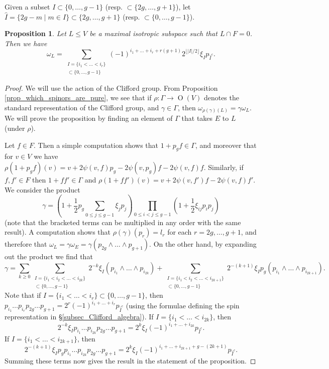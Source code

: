 \documentclass{article} %
\newtheorem{proposition}{Proposition}[section]
\numberwithin{equation}{section}
\DeclareMathOperator{\OO}{O}
\begin{document}
Given a subset $I \subset \{ 0, \dots, g-1 \}$ (resp. $\subset \{ 2g, \dots, g+1 \}$), let $\widehat{I} = \{ 2g-m \mid m \in I \} \subset \{ 2g, \dots, g+1 \}$ (resp. $\subset \{ 0, \dots, g-1 \}$).   
\begin{proposition}\label{prop_computation_of_pure_spinor}
    Let $L \leq V$ be a maximal isotropic subspace such that $L \cap F = 0$. Then we have 
    \[ \omega_L = \sum_{\substack{ I=\{i_1 < \dots < i_r\} \\ \subset \{ 0, \dots, g-1 \}}} (-1)^{i_1 + \dots + i_r + r(g+1)} 2^{\lfloor |I| /2 \rfloor} \xi_{I} p_{\widehat{I}^c}. \]
\end{proposition}
\begin{proof}
    We will use the action of the Clifford group. From Proposition \ref{prop_which_spinors_are_pure}, we see that if $\rho : \Gamma\to \OO(V)$ denotes the standard representation of the Clifford group, and $\gamma \in \Gamma$, then $\omega_{\rho(\gamma)(L)} = \gamma \omega_L$. We will prove the proposition by finding an element of $\Gamma$ that takes $E$ to $L$ (under $\rho$). 

    Let $f \in F$. Then a simple computation shows that $1 + p_g f \in \Gamma$, and moreover that for $v \in V$ we have $\rho(1 + p_g f)(v) = v + 2 \psi(v, f) p_g - 2 \psi(v, p_g)f - 2 \psi(v, f) f$. Similarly, if $f, f' \in F$ then $1 + f f' \in \Gamma$ and $\rho(1 + f f ')(v) = v + 2 \psi(v, f') f - 2 \psi(v, f) f'$. We consider the product
    \[ \gamma = \left(1 +   \frac{1}{2} p_g \sum_{0 \leq j \leq g-1} \xi_j p_j \right) \prod_{0 \leq i < j \leq g-1} \left(1 + \frac{1}{2} \xi_{ij} p_i p_j \right) \]
    (note that the bracketed terms can be multiplied in any order with the same result). A computation shows that $\rho(\gamma)(p_r) = l_r$ for each $r = 2g, \dots, g+1$, and therefore that $\omega_L = \gamma \omega_E = \gamma (p_{2g} \wedge \dots \wedge p_{g+1})$. On the other hand, by expanding out the product we find that 
    \[ \gamma = \sum_{k \geq 0} \sum_{\substack{I = \{ i_1 < i_2 < \dots < i_{2k} \} \\ \subset \{ 0, \dots, g-1 \}}} 2^{-k} \xi_I (p_{i_1} \wedge \dots \wedge p_{i_{2k}}) + \sum_{\substack{I = \{ i_1 < i_2 < \dots < i_{2k+1} \} \\ \subset \{ 0, \dots, g-1 \}}} 2^{-(k+1)} \xi_I p_g (p_{i_1} \wedge \dots \wedge p_{i_{2k+1}}). \]
    Note that if $I = \{ i_1 < \dots < i_r \} \subset \{ 0, \dots, g-1 \}$, then  $p_{i_1} \dots p_{i_r} p_{2g} \dots p_{g+1} = 2^r (-1)^{i_1 + \dots + i_r} p_{\widehat{I}^c}$ (using the formulae defining the spin representation in \S \ref{subsec_Clifford_algebra}). If $I = \{ i_1 < \dots < i_{2k} \}$, then
    \[ 2^{-k} \xi_I p_{i_1} \dots p_{i_{2k}} p_{2g} \dots p_{g+1} = 2^k \xi_I (-1)^{i_1 + \dots + i_{2k}} p_{\widehat{I}^c}. \]
    If $I = \{ i_1 < \dots < i_{2k+1} \}$, then
    \[ 2^{-(k+1)} \xi_I p_g p_{i_1} \dots p_{i_{2k}} p_{2g} \dots p_{g+1} = 2^k \xi_I (-1)^{i_1 + \dots + i_{2k+1} + g-(2k+1)} p_{\widehat{I}^c}. \]
    Summing these terms now gives the result in the statement of the proposition. 
\end{proof}
\end{document}

